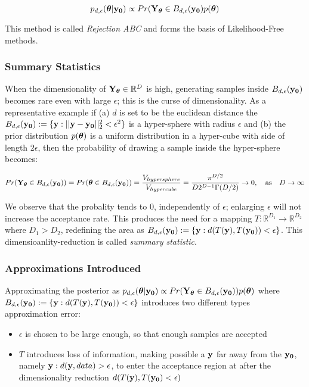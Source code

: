 \begin{equation} \label{eq:approx_posterior}
  p_{d,\epsilon}(\boldsymbol{\theta}|\mathbf{y_0}) \propto Pr(\mathbf{Y}_{\boldsymbol{\theta}} \in
  B_{d,\epsilon}(\mathbf{y_0}) p(\boldsymbol{\theta})
\end{equation}

\noindent
This method is called \textit{Rejection ABC} and forms the basis of
Likelihood-Free methods.

\subsubsection{Summary Statistics}

When the dimensionality of $\mathbf{Y}_{\boldsymbol{\theta}} \in \mathbb{R}^D$ is high,
generating samples inside $B_{d,\epsilon} (\mathbf{y_0})$ becomes rare even with
large $\epsilon$; this is the curse of dimensionality. As a
representative example if (a) $d$ is set to be the euclidean distance
the $B_{d,\epsilon}(\mathbf{y_0}) := \{ \mathbf{y}: ||\mathbf{y} - \mathbf{y_0}||_2^2 < \epsilon^2 \}$ is
a hyper-sphere with radius $\epsilon$ and (b) the prior distribution
$p(\boldsymbol{\theta})$ is a uniform distribution in a hyper-cube with side of
length $2\epsilon$, then the probability of drawing a sample inside
the hyper-sphere becomes:

\begin{equation}
  Pr(\mathbf{Y}_{\boldsymbol{\theta}} \in B_{d,\epsilon} (\mathbf{y_0})) = Pr(\boldsymbol{\theta} \in B_{d,\epsilon} (\mathbf{y_0})) = \frac{V_{hypersphere}}{V_{hypercube}} = \frac{\pi^{D/2}}{D2^{D-1}\Gamma(D/2)} \rightarrow 0, \quad \text{as} \quad D \rightarrow \infty
\end{equation}

\noindent 
We observe that the probality tends to $0$, independently of
$\epsilon$; enlarging $\epsilon$ will not increase the acceptance
rate. This produces the need for a mapping
$T: \mathbb{R}^{D_1} \rightarrow \mathbb{R}^{D_2}$ where $D_1 > D_2$,
redefining the area as
$B_{d,\epsilon}(\mathbf{y_0}) := \{\mathbf{y}: d(T(\mathbf{y}), T(\mathbf{y_0})) < \epsilon \}$. This
dimensioanlity-reduction is called \textit{summary statistic}.

\subsubsection{Approximations Introduced}

Approximating the posterior as
$p_{d,\epsilon}(\boldsymbol{\theta}|\mathbf{y_0}) \propto Pr(\mathbf{Y}_{\boldsymbol{\theta}} \in
B_{d,\epsilon}(\mathbf{y_0}))p(\boldsymbol{\theta})$ where
$B_{d,\epsilon}(\mathbf{y_0}) := \{\mathbf{y}: d(T(\mathbf{y}), T(\mathbf{y_0})) < \epsilon \}$
introduces two different types approximation error:

\begin{itemize}
\item $\epsilon$ is chosen to be large enough, so that enough samples
  are accepted
\item $T$ introduces loss of information, making possible a $\mathbf{y}$ far
  away from the $\mathbf{y_0}$, namely $\mathbf{y}: d(\mathbf{y},data)>\epsilon$, to enter
  the acceptance region at after the dimensionality reduction
  $d(T(\mathbf{y}), T(\mathbf{y_0}) < \epsilon)$
\end{itemize}

